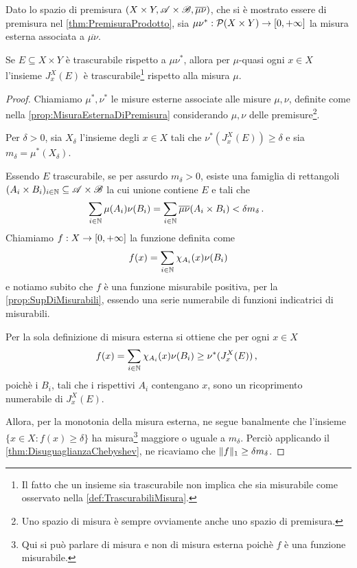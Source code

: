 \begin{proposition}\label{prop:TrascurabiliProdotto}
	Dato lo spazio di premisura $(X\times Y,\mathscr A\times\mathscr B,\overline{\mu\nu})$, che si è mostrato essere di premisura nel \cref{thm:PremisuraProdotto}, sia $\mu\nu^*:\mathcal P(X\times Y)\to[0,+\infty]$ la misura esterna associata a $\overline{\mu\nu}$.
	
	Se $E\subseteq X\times Y$ è trascurabile rispetto a $\mu\nu^*$, allora per $\mu$-quasi ogni $x\in X$ l'insieme $J_x^X(E)$ è trascurabile\footnote{Il fatto che un insieme sia trascurabile non implica che sia misurabile come osservato nella \cref{def:TrascurabiliMisura}.} rispetto alla misura $\mu$.
\end{proposition}
\begin{proof}
	Chiamiamo $\mu^*,\nu^*$ le misure esterne associate alle misure $\mu,\nu$, definite come nella \cref{prop:MisuraEsternaDiPremisura} considerando $\mu,\nu$ delle premisure\footnote{Uno spazio di misura è sempre ovviamente anche uno spazio di premisura.}.
	
	Per $\delta>0$, sia $X_\delta$ l'insieme degli $x\in X$ tali che $\nu^*(J_x^X(E))\ge\delta$ e sia $m_\delta=\mu^*(X_\delta)$.
	
	Essendo $E$ trascurabile, se per assurdo $m_\delta>0$, esiste una famiglia di rettangoli $(A_i\times B_i)_{i\in\mathbb N}\subseteq \mathscr A\times\mathscr B$ la cui unione contiene $E$ e tali che
	\begin{equation*}
		\sum_{i\in\mathbb N}\mu(A_i)\nu(B_i)=\sum_{i\in\mathbb N}\overline{\mu\nu}(A_i\times B_i)< \delta m_\delta \, \text{. }
	\end{equation*}
	Chiamiamo $f:X\to[0,+\infty]$ la funzione definita come
	\begin{equation*}
		f(x)=\sum_{i\in\mathbb N}\chi_{A_i}(x)\nu(B_i)
	\end{equation*}
	e notiamo subito che $f$ è una funzione misurabile positiva, per la \cref{prop:SupDiMisurabili}, essendo una serie numerabile di funzioni indicatrici di misurabili.
	
	Per la sola definizione di misura esterna si ottiene che per ogni $x\in X$
	\begin{equation*}
		f(x)=\sum_{i\in\mathbb N}\chi_{A_i}(x)\nu(B_i)\ge\nu^*(J_x^X(E))\, \text{, }
	\end{equation*}
	poichè i $B_i$, tali che i rispettivi $A_i$ contengano $x$, sono un ricoprimento numerabile di $J_x^X(E)$.
	
	Allora, per la monotonia della misura esterna, ne segue banalmente che l'insieme $\{x\in X:f(x)\ge\delta\}$ ha misura\footnote{Qui si può parlare di misura e non di misura esterna poichè $f$ è una funzione misurabile.} maggiore o uguale a $m_\delta$.
	Perciò applicando il \cref{thm:DisuguaglianzaChebyshev}, ne ricaviamo che $\Vert f\Vert_1\ge \delta m_\delta$.


\end{proof}
